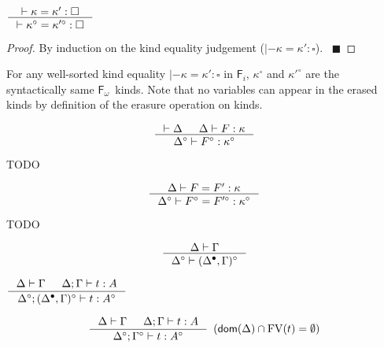 \documentclass{llncs}
\renewcommand{\qed}{~\hfill$\blacksquare$}
\newcommand{\Fi}{\ensuremath{\mathsf{F}_i}}
\newcommand{\Fw}{\ensuremath{\mathsf{F}_\omega}}
\newcommand{\dom}{\mathop{\mathsf{dom}}}
\newcommand{\FV}{\mathop{\mathrm{FV}}}
\begin{document}
\begin{theorem}\label{thm:ierasekindeq}
$ \inference{|- \kappa=\kappa':\square}
        {|- \kappa^\circ=\kappa'^\circ:\square}
$
\end{theorem}
\begin{proof}
	By induction on the kind equality judgement
	($|- \kappa=\kappa':\square$).
	\qed
\end{proof}
\begin{remark}
For any well-sorted kind equality $|- \kappa=\kappa':\square$ in \Fi,
$\kappa^\circ$ and $\kappa'^\circ$ are the syntactically same \Fw\ kinds.
Note that no variables can appear in the erased kinds by definition of
the erasure operation on kinds.
\end{remark}

\begin{theorem}
\label{thm:ierasekinding}
\[ \inference{|- \Delta & \Delta |- F : \kappa}
                {\Delta^\circ |- F^\circ : \kappa^\circ}
\]
\end{theorem}
\begin{remark} TODO
\end{remark}


\begin{theorem}
\label{thm:ierasetyconeq}
\[ \inference{\Delta |- F=F':\kappa}
                {\Delta^\circ |- F^\circ=F'^\circ:\kappa^\circ}
\]
\end{theorem}
\begin{remark} TODO
\end{remark}

\begin{theorem}
\label{thm:ierasetmctxivs}
\[ \inference{\Delta |- \Gamma}{\Delta^\circ |- (\Delta^\bullet,\Gamma)^\circ}
\]
\end{theorem}

\begin{theorem}
\label{thm:ierasetypingall}
$ \inference{\Delta |- \Gamma & \Delta;\Gamma |- t : A}
                {\Delta^\circ;(\Delta^\bullet,\Gamma)^\circ |- t : A^\circ}
$
\end{theorem}

\begin{corollary}
\label{thm:ierasetypingifree}
\[ \inference{ \Delta |- \Gamma & \Delta;\Gamma |- t : A}
                {\Delta^\circ;\Gamma^\circ |- t : A^\circ}
                {\enspace(\dom(\Delta)\cap\FV(t) = \emptyset)}
\]
\end{corollary}
\end{document}
